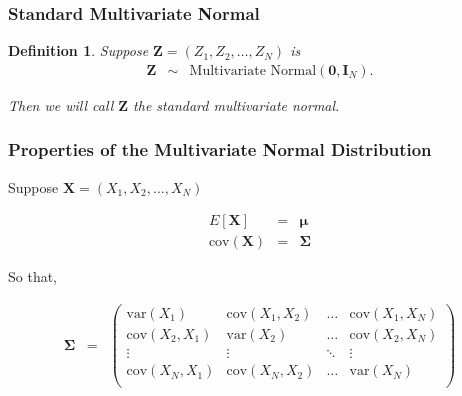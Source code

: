 \documentclass{beamer}
\newtheorem{defn}{Definition}
\numberwithin{equation}{section}
\begin{document}
\begin{frame}
\frametitle{Standard Multivariate Normal}

\begin{defn}

Suppose $\boldsymbol{Z} = (Z_{1}, Z_{2}, \hdots, Z_{N}) $ is 
\begin{eqnarray}
\boldsymbol{Z} & \sim & \text{Multivariate Normal}(\boldsymbol{0}, \boldsymbol{I}_{N} ) . \nonumber
\end{eqnarray}

Then we will call $\boldsymbol{Z}$ the standard multivariate normal.  
\end{defn}



\end{frame}

\begin{frame}
\frametitle{Properties of the Multivariate Normal Distribution}

Suppose $\boldsymbol{X} = (X_{1}, X_{2}, \hdots, X_{N} ) $

\begin{eqnarray}
E[\boldsymbol{X} ] & = &  \boldsymbol{\mu}\nonumber \\
\text{cov}(\boldsymbol{X} ) & = & \boldsymbol{\Sigma} \nonumber 
\end{eqnarray}

So that, 

\begin{eqnarray}
\boldsymbol{\Sigma}  & = & \begin{pmatrix} 
\text{var}(X_{1}) & \text{cov}(X_{1}, X_{2}) & \hdots & \text{cov}(X_{1}, X_{N}) \\
\text{cov}(X_{2}, X_{1}) & \text{var}(X_{2}) & \hdots & \text{cov}(X_{2}, X_{N} ) \\
\vdots & \vdots & \ddots & \vdots \\
\text{cov}(X_{N}, X_{1} ) & \text{cov}(X_{N}, X_{2} ) & \hdots & \text{var}(X_{N} ) \\
\end{pmatrix} \nonumber 
\end{eqnarray}


\end{frame}
\end{document}
